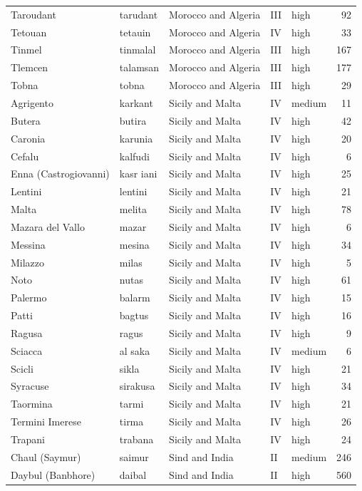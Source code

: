 \documentclass[11pt,a4paper]{article}
\begin{document}
{\begin{longtable}{p{4.6cm}p{3.0cm}p{3.6cm}llr}
Taroudant & tarudant & Morocco and Algeria & III & high & 92\\
Tetouan & tetauin & Morocco and Algeria & IV & high & 33\\
Tinmel & tinmalal & Morocco and Algeria & III & high & 167\\
Tlemcen & talamsan & Morocco and Algeria & III & high & 177\\
Tobna & tobna & Morocco and Algeria & III & high & 29\\
Agrigento & karkant & Sicily and Malta & IV & medium & 11\\
Butera & butira & Sicily and Malta & IV & high & 42\\
Caronia & karunia & Sicily and Malta & IV & high & 20\\
Cefalu & kalfudi & Sicily and Malta & IV & high & 6\\
Enna (Castrogiovanni) & kasr iani & Sicily and Malta & IV & high & 25\\
Lentini & lentini & Sicily and Malta & IV & high & 21\\
Malta & melita & Sicily and Malta & IV & high & 78\\
Mazara del Vallo & mazar & Sicily and Malta & IV & high & 6\\
Messina & mesina & Sicily and Malta & IV & high & 34\\
Milazzo & milas & Sicily and Malta & IV & high & 5\\
Noto & nutas & Sicily and Malta & IV & high & 61\\
Palermo & balarm & Sicily and Malta & IV & high & 15\\
Patti & bagtus & Sicily and Malta & IV & high & 16\\
Ragusa & ragus & Sicily and Malta & IV & high & 9\\
Sciacca & al saka & Sicily and Malta & IV & medium & 6\\
Scicli & sikla & Sicily and Malta & IV & high & 21\\
Syracuse & sirakusa & Sicily and Malta & IV & high & 34\\
Taormina & tarmi & Sicily and Malta & IV & high & 21\\
Termini Imerese & tirma & Sicily and Malta & IV & high & 26\\
Trapani & trabana & Sicily and Malta & IV & high & 24\\
Chaul (Saymur) & saimur & Sind and India & II & medium & 246\\
Daybul (Banbhore) & daibal & Sind and India & II & high & 560\\

\end{longtable}}
\end{document}
